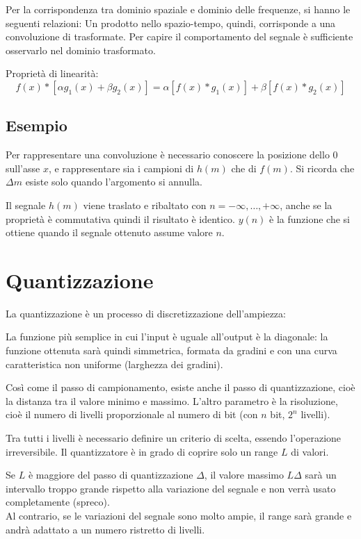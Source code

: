 Per la corrispondenza tra dominio spaziale e dominio delle frequenze, si hanno le seguenti relazioni:
Un prodotto nello spazio-tempo, quindi, corrisponde a una convoluzione di trasformate. Per capire il comportamento del segnale è sufficiente osservarlo nel dominio trasformato.

Proprietà di linearità:
$$f(x) * [\alpha g_1(x) + \beta g_2(x)] = \alpha[f(x) * g_1(x)] + \beta[f(x) * g_2(x)]$$

\subsection{Esempio}
Per rappresentare una convoluzione è necessario conoscere la posizione dello 0 sull'asse $x$, e rappresentare sia i campioni di $h(m)$ che di $f(m)$. Si ricorda che $\Delta m$ esiste solo quando l'argomento si annulla.

Il segnale $h(m)$ viene traslato e ribaltato con $n = -\infty, \dots, +\infty$, anche se la proprietà è commutativa quindi il risultato è identico. $y(n)$ è la funzione che si ottiene quando il segnale ottenuto assume valore $n$. 

\section{Quantizzazione}
La quantizzazione è un processo di discretizzazione dell'ampiezza: 

La funzione più semplice in cui l'input è uguale all'output è la diagonale: la funzione ottenuta sarà quindi simmetrica, formata da gradini e con una curva caratteristica non uniforme (larghezza dei gradini).

Così come il passo di campionamento, esiste anche il passo di quantizzazione, cioè la distanza tra il valore minimo e massimo. L'altro parametro è la risoluzione, cioè il numero di livelli proporzionale al numero di bit (con $n$ bit, $2^n$ livelli). 

Tra tutti i livelli è necessario definire un criterio di scelta, essendo l'operazione irreversibile. Il quantizzatore è in grado di coprire solo un range $L$ di valori.

Se $L$ è maggiore del passo di quantizzazione $\Delta$, il valore massimo $L\Delta$ sarà un intervallo troppo grande rispetto alla variazione del segnale e non verrà usato completamente (spreco). \\
Al contrario, se le variazioni del segnale sono molto ampie, il range sarà grande e andrà adattato a un numero ristretto di livelli. 

